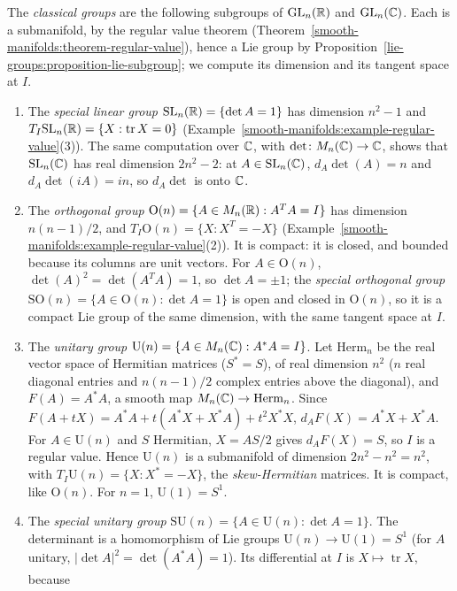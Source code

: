 \begin{example}\label{lie-groups:example-classical-groups}
The \emph{classical groups} are the following subgroups of $\mathrm{GL}_n(\mathbb{R})$ and $\mathrm{GL}_n(\mathbb{C})$. Each is a submanifold, by the regular value theorem
(Theorem~\ref{smooth-manifolds:theorem-regular-value}), hence a Lie group by Proposition~\ref{lie-groups:proposition-lie-subgroup}; we compute its dimension and
its tangent space at $I$.
\begin{enumerate}
\item The \emph{special linear group} $\mathrm{SL}_n(\mathbb{R}) = \{\det A = 1\}$ has dimension $n^2 - 1$ and $T_I\mathrm{SL}_n(\mathbb{R}) = \{X : \operatorname{tr}X = 0\}$
(Example~\ref{smooth-manifolds:example-regular-value}(3)). The same computation over $\mathbb{C}$, with $\det \colon M_n(\mathbb{C}) \to \mathbb{C}$, shows that
$\mathrm{SL}_n(\mathbb{C})$ has real dimension $2n^2 - 2$: at $A \in \mathrm{SL}_n(\mathbb{C})$, $d_A\det(A) = n$ and $d_A\det(iA) = in$, so $d_A\det$ is onto $\mathbb{C}$.
\item The \emph{orthogonal group} $\mathrm{O}(n) = \{A \in M_n(\mathbb{R}) : A^TA = I\}$ has dimension $n(n - 1)/2$, and $T_I\mathrm{O}(n) = \{X : X^T = -X\}$
(Example~\ref{smooth-manifolds:example-regular-value}(2)). It is compact: it is closed, and bounded because its columns are unit vectors. For
$A \in \mathrm{O}(n)$, $\det(A)^2 = \det(A^TA) = 1$, so $\det A = \pm1$; the \emph{special orthogonal group} $\mathrm{SO}(n) = \{A \in \mathrm{O}(n) :
\det A = 1\}$ is open and closed in $\mathrm{O}(n)$, so it is a compact Lie group of the same dimension, with the same tangent space at $I$.
\item The \emph{unitary group} $\mathrm{U}(n) = \{A \in M_n(\mathbb{C}) : A^*A = I\}$. Let $\mathrm{Herm}_n$ be the real vector space of Hermitian matrices
($S^* = S$), of real dimension $n^2$ ($n$ real diagonal entries and $n(n - 1)/2$ complex entries above the diagonal), and $F(A) = A^*A$, a smooth map
$M_n(\mathbb{C}) \to \mathrm{Herm}_n$. Since $F(A + tX) = A^*A + t(A^*X + X^*A) + t^2X^*X$, $d_AF(X) = A^*X + X^*A$. For $A \in \mathrm{U}(n)$ and $S$ Hermitian,
$X = AS/2$ gives $d_AF(X) = S$, so $I$ is a regular value. Hence $\mathrm{U}(n)$ is a submanifold of dimension $2n^2 - n^2 = n^2$, with
$T_I\mathrm{U}(n) = \{X : X^* = -X\}$, the \emph{skew-Hermitian} matrices. It is compact, like $\mathrm{O}(n)$. For $n = 1$, $\mathrm{U}(1) = S^1$.
\item The \emph{special unitary group} $\mathrm{SU}(n) = \{A \in \mathrm{U}(n) : \det A = 1\}$. The determinant is a homomorphism of Lie groups
$\mathrm{U}(n) \to \mathrm{U}(1) = S^1$ (for $A$ unitary, $|\det A|^2 = \det(A^*A) = 1$). Its differential at $I$ is $X \mapsto \operatorname{tr}X$, because

\end{enumerate}
\end{example}
